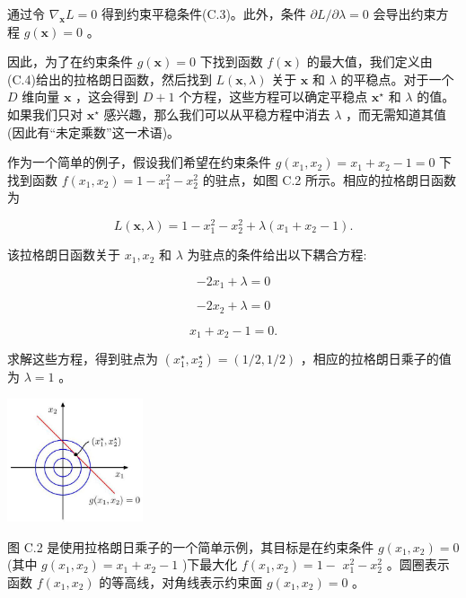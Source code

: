 \documentclass[10pt]{article}
\begin{document}
通过令 \({\nabla }_{\mathbf{x}}L = 0\) 得到约束平稳条件(C.3)。此外，条件 \(\partial L/\partial \lambda  = 0\) 会导出约束方程 \(g\left( \mathbf{x}\right)  = 0\) 。

因此，为了在约束条件 \(g\left( \mathbf{x}\right)  = 0\) 下找到函数 \(f\left( \mathbf{x}\right)\) 的最大值，我们定义由(C.4)给出的拉格朗日函数，然后找到 \(L\left( {\mathbf{x},\lambda }\right)\) 关于 \(\mathbf{x}\) 和 \(\lambda\) 的平稳点。对于一个 \(D\) 维向量 \(\mathbf{x}\) ，这会得到 \(D + 1\) 个方程，这些方程可以确定平稳点 \({\mathbf{x}}^{ \star  }\) 和 \(\lambda\) 的值。如果我们只对 \({\mathbf{x}}^{ \star  }\) 感兴趣，那么我们可以从平稳方程中消去 \(\lambda\) ，而无需知道其值(因此有“未定乘数”这一术语)。

作为一个简单的例子，假设我们希望在约束条件 \(g\left( {{x}_{1},{x}_{2}}\right)  = {x}_{1} + {x}_{2} - 1 = 0\) 下找到函数 \(f\left( {{x}_{1},{x}_{2}}\right)  = 1 - {x}_{1}^{2} - {x}_{2}^{2}\) 的驻点，如图 C.2 所示。相应的拉格朗日函数为

\[
L\left( {\mathbf{x},\lambda }\right)  = 1 - {x}_{1}^{2} - {x}_{2}^{2} + \lambda \left( {{x}_{1} + {x}_{2} - 1}\right) . \tag{C.5}
\]

该拉格朗日函数关于 \({x}_{1},{x}_{2}\) 和 \(\lambda\) 为驻点的条件给出以下耦合方程:

\[
- 2{x}_{1} + \lambda  = 0 \tag{C.6}
\]

\[
- 2{x}_{2} + \lambda  = 0 \tag{C.7}
\]

\[
{x}_{1} + {x}_{2} - 1 = 0. \tag{C.8}
\]

求解这些方程，得到驻点为 \(\left( {{x}_{1}^{ \star  },{x}_{2}^{ \star  }}\right)  = \left( {1/2,1/2}\right)\) ，相应的拉格朗日乘子的值为 \(\lambda  = 1\) 。

\begin{center}
\includegraphics[max width=0.3\textwidth]{images/0194e279-9b28-703a-88f4-c3ac21e2010d_642_1098_344_450_409_0.jpg}
\end{center}
\hspace*{3em} 

图 C.2 是使用拉格朗日乘子的一个简单示例，其目标是在约束条件 \(g\left( {{x}_{1},{x}_{2}}\right)  = 0\) (其中 \(g\left( {{x}_{1},{x}_{2}}\right)  = {x}_{1} + {x}_{2} - 1\) )下最大化 \(f\left( {{x}_{1},{x}_{2}}\right)  = 1 -\)  \({x}_{1}^{2} - {x}_{2}^{2}\) 。圆圈表示函数 \(f\left( {{x}_{1},{x}_{2}}\right)\) 的等高线，对角线表示约束面 \(g\left( {{x}_{1},{x}_{2}}\right)  = 0\) 。
\end{document}
